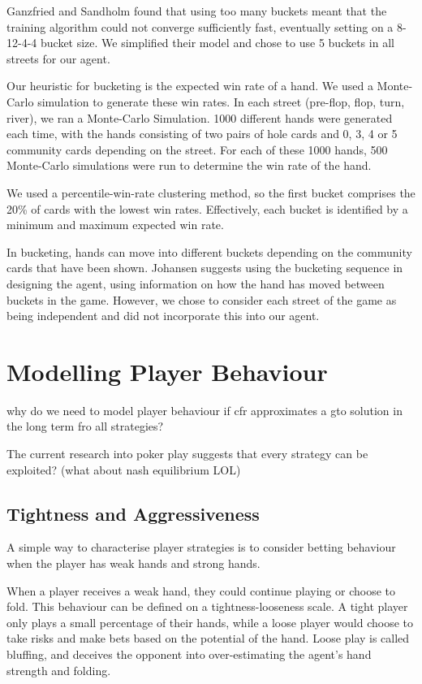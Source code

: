\documentclass{article}
\begin{document}
Ganzfried and Sandholm found that using too many buckets meant that the training algorithm could not converge sufficiently fast, eventually setting on a 8-12-4-4 bucket size. We simplified their model and chose to use 5 buckets in all streets for our agent.

Our heuristic for bucketing is the expected win rate of a hand. We used a Monte-Carlo simulation to generate these win rates. In each street (pre-flop, flop, turn, river), we ran a Monte-Carlo Simulation. 1000 different hands were generated each time, with the hands consisting of two pairs of hole cards and 0, 3, 4 or 5 community cards depending on the street. For each of these 1000 hands, 500 Monte-Carlo simulations were run to determine the win rate of the hand.

We used a percentile-win-rate clustering method, so the first bucket comprises the 20\% of cards with the lowest win rates. Effectively, each bucket is identified by a minimum and maximum expected win rate.

In bucketing, hands can move into different buckets depending on the community cards that have been shown. Johansen suggests using the bucketing sequence in designing the agent, using information on how the hand has moved between buckets in the game. However, we chose to consider each street of the game as being independent and did not incorporate this into our agent.

\section{Modelling Player Behaviour}
why do we need to model player behaviour if cfr approximates a gto solution in the long term fro all strategies? 

The current research into poker play suggests that every strategy can be exploited? (what about nash equilibrium LOL)

\subsection{Tightness and Aggressiveness}
A simple way to characterise player strategies is to consider betting behaviour when the player has weak hands and strong hands. 

When a player receives a weak hand, they could continue playing or choose to fold. This behaviour can be defined on a tightness-looseness scale. A tight player only plays a small percentage of their hands, while a loose player would choose to take risks and make bets based on the potential of the hand. Loose play is called bluffing, and deceives the opponent into over-estimating the agent's hand strength and folding.
\end{document}
